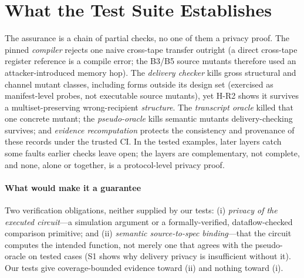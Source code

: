 \documentclass[conference]{IEEEtran}
\begin{document}
\section{What the Test Suite Establishes}
\label{sec:boundary}
The assurance is a chain of partial checks, no one of them a privacy proof. The pinned
\emph{compiler} rejects one naive cross-tape transfer outright (a direct cross-tape register
reference is a compile error; the B3/B5 source mutants therefore used an attacker-introduced
memory hop). The \emph{delivery checker} kills gross structural and channel mutant classes,
including forms outside its design set (exercised as manifest-level probes, not executable
source mutants), yet H-R2 shows it survives a multiset-preserving wrong-recipient
\emph{structure}. The \emph{transcript oracle} killed that one concrete mutant; the
\emph{pseudo-oracle} kills semantic mutants delivery-checking survives; and \emph{evidence
recomputation} protects the consistency and provenance of these records under the trusted CI.
In the tested examples, later layers catch some faults earlier checks leave open; the layers
are complementary, not complete, and none, alone or together, is a protocol-level privacy
proof.

\paragraph{What would make it a guarantee}
Two verification obligations, neither supplied by our tests: (i) \emph{privacy of the
executed circuit}---a simulation argument or a formally-verified, dataflow-checked
comparison primitive; and (ii) \emph{semantic source-to-spec binding}---that the circuit
computes the intended function, not merely one that agrees with the pseudo-oracle on tested
cases (S1 shows why delivery privacy is insufficient without it). Our tests give
coverage-bounded evidence toward (ii) and nothing toward (i).

\end{document}
